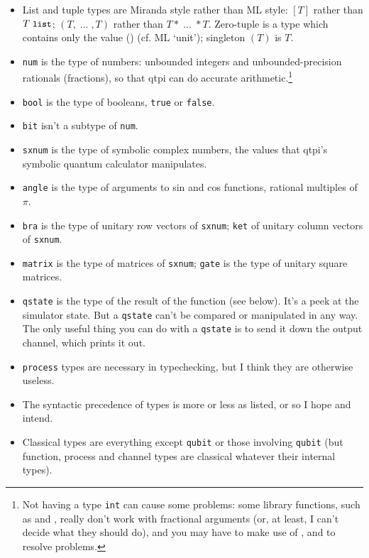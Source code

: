\documentclass[11pt,a4paper]{article}
\newcommand{\verbtt}[1]{\texttt{\small{}#1}}
\begin{document}
\begin{itemize}
\item List and tuple types are Miranda style rather than ML style: $[T]$ rather than $T\;\verbtt{list}$; $(T,\;...\;,T)$ rather than $T*\;...\;*T$. Zero-tuple is a type which contains only the value () (cf. ML `unit'); singleton $(T)$ is $T$.
\item \verbtt{num} is the type of numbers: unbounded integers and unbounded-precision rationals (fractions), so that qtpi can do accurate arithmetic.\footnote{Not having a type \verbtt{int} can cause some problems: some library functions, such as  and , really don't work with fractional arguments (or, at least, I can't decide what they should do), and you may have to make use of ,  and  to resolve problems.}
\item \verbtt{bool} is the type of booleans, \verbtt{true} or \verbtt{false}.
\item \verbtt{bit} isn't a subtype of \verbtt{num}.
\item \verbtt{sxnum} is the type of symbolic complex numbers, the values that qtpi's symbolic quantum calculator manipulates.
\item \verbtt{angle} is the type of arguments to sin and cos functions, rational multiples of $\pi$.
\item \verbtt{bra} is the type of unitary row vectors of \verbtt{sxnum}; \verbtt{ket} of unitary column vectors of \verbtt{sxnum}. 
\item \verbtt{matrix}  is the type of matrices of \verbtt{sxnum}; \verbtt{gate} is the type of unitary square matrices.
\item \verbtt{qstate}  is the type of the result of the   function (see below). It's a peek at the simulator state. But a \verbtt{qstate} can't be compared or manipulated in any way. The only useful thing you can do with a \verbtt{qstate}  is to send it down the  output channel, which prints it out.
\item \verbtt{process} types are necessary in typechecking, but I think they are otherwise useless.
\item The syntactic precedence of types is more or less as listed, or so I hope and intend. 
\item Classical types are everything except \verbtt{qubit}  or those involving \verbtt{qubit}  (but function, process and channel types are classical whatever their internal types).  

\end{itemize}
\end{document}
